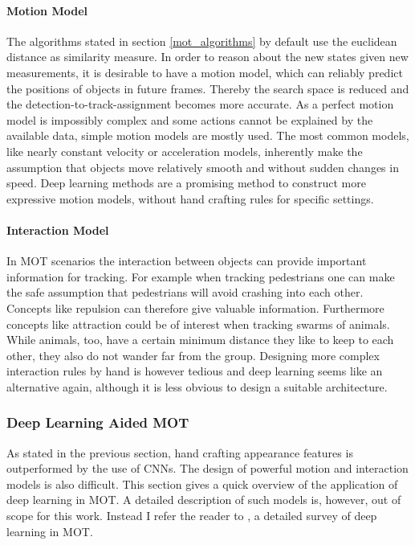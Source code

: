 \documentclass[12pt,a4paper]{article}
\begin{document}
\paragraph{Motion Model} The algorithms stated in section \ref{mot_algorithms} by default use the euclidean distance as similarity measure. In order to reason about the new states given new measurements, it is desirable to have a motion model, which can reliably predict the positions of objects in future frames. Thereby the search space is reduced and the detection-to-track-assignment becomes more accurate. As a perfect motion model is impossibly complex and some actions cannot be explained by the available data, simple motion models are mostly used. The most common models, like nearly constant velocity or acceleration models, inherently make the assumption that objects move relatively smooth and without sudden changes in speed. Deep learning methods are a promising method to construct more expressive motion models, without hand crafting rules for specific settings.

\paragraph{Interaction Model} In MOT scenarios the interaction between objects can provide important information for tracking. For example when tracking pedestrians one can make the safe assumption that pedestrians will avoid crashing into each other. Concepts like repulsion can therefore give valuable information. Furthermore concepts like attraction could be of interest when tracking swarms of animals. While animals, too, have a certain minimum distance they like to keep to each other, they also do not wander far from the group. Designing more complex interaction rules by hand is however tedious and deep learning seems like an alternative again, although it is less obvious to design a suitable architecture.

\subsubsection{Deep Learning Aided MOT}
\label{dl_aided_mot}

As stated in the previous section, hand crafting appearance features is outperformed by the use of CNNs. The design of powerful motion and interaction models is also difficult. This section gives a quick overview of the application of deep learning in MOT. A detailed description of such models is, however, out of scope for this work. Instead I refer the reader to  \cite{dl_in_mot}, a detailed survey of deep learning in MOT.
\end{document}

